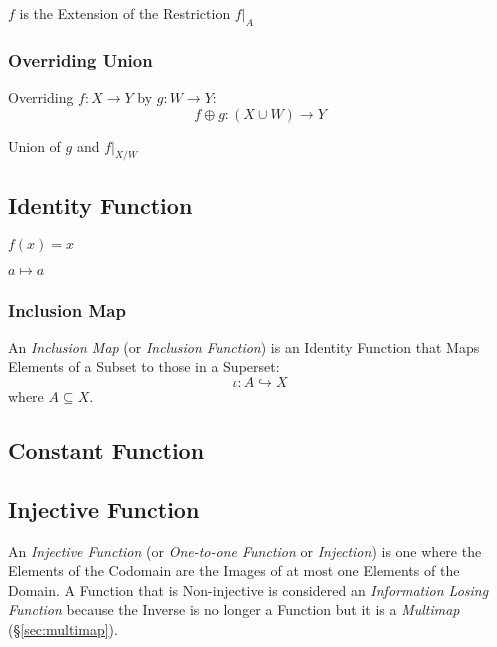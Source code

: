 $f$ is the Extension of the Restriction $f|_A$



\subsubsection{Overriding Union}\label{sec:overriding_union}

Overriding $f : X \rightarrow Y$ by $g : W \rightarrow Y$:
\[
  f \oplus g : (X \cup W) \rightarrow Y
\]

Union of $g$ and $f|_{X/W}$



\subsection{Identity Function}\label{sec:identity_function}

$f(x) = x$

$a \mapsto a$



\subsubsection{Inclusion Map}\label{sec:inclusion_map}

An \emph{Inclusion Map} (or \emph{Inclusion Function}) is an Identity
Function that Maps Elements of a Subset to those in a Superset:
\[
  \iota : A \hookrightarrow X
\]
where $A \subseteq X$.



\subsection{Constant Function}\label{sec:constant_function}

\subsection{Injective Function}\label{sec:injective_function}

An \emph{Injective Function} (or \emph{One-to-one Function} or
\emph{Injection}) is one where the Elements of the Codomain are the
Images of at most one Elements of the Domain. A Function that is
Non-injective is considered an \emph{Information Losing Function}
because the Inverse is no longer a Function but it is a
\emph{Multimap} (\S\ref{sec:multimap}).



